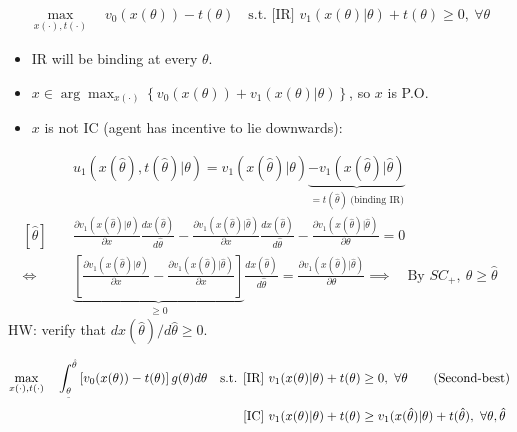 \documentclass[11pt,leqno]{article}
\begin{document}

\begin{align}
    \max_{x(\cdot),t(\cdot)} \quad v_{0}(x(\theta))-t(\theta)\quad \text{s.t. [IR] } v_{1}(x(\theta)|\theta)+t(\theta)\geq 0,~ \forall \theta \tag{First-best}
\end{align}
\begin{itemize}
    \item IR will be binding at every $\theta$.
    \item $x\in \arg \max_{x(\cdot)} \left\{ v_{0}(x(\theta))+ v_{1}(x(\theta)|\theta)\right\}$, so $x$ is P.O.
    \item $x$ is not IC (agent has incentive to lie downwards):
\end{itemize}

\begin{align*}
    &u_{1}(x(\hat{\theta}),t(\hat{\theta})|\theta)=v_{1}(x(\hat{\theta})|\theta)\underbrace{-v_{1}(x(\hat{\theta})|\hat{\theta})}_{=t(\hat{\theta}) ~\text{(binding IR)}}\\
    [\hat{\theta}] \quad &\frac{\partial v_{1}(x(\hat{\theta})|\theta)}{\partial x}\frac{d x(\hat{\theta})}{d \hat{\theta}}-\frac{\partial v_{1}(x(\hat{\theta})|\hat{\theta})}{\partial x}\frac{d x(\hat{\theta})}{d \hat{\theta}}-\frac{\partial v_{1}(x(\hat{\theta})|\hat{\theta})}{\partial \theta}=0\\
    \iff \quad &\underbrace{\left[\frac{\partial v_{1}(x(\hat{\theta})|\theta)}{\partial x}-\frac{\partial v_{1}(x(\hat{\theta})|\hat{\theta})}{\partial x}\right]}_{\geq 0}\frac{d x(\hat{\theta})}{d \hat{\theta}}=\frac{\partial v_{1}(x(\hat{\theta})|\hat{\theta})}{\partial \theta}
    \implies \quad \text{By } SC_{+}, ~\theta \geq \hat{\theta}
\end{align*}
HW: verify that $d x(\hat{\theta})/d \hat{\theta}\geq 0$.

\begin{align}
    \max_{x(\cdot),t(\cdot)} \quad \int_{\underset{\bar{}}{\theta}}^{\hat{\theta}} \left[v_{0}(x(\theta))-t(\theta)\right] g(\theta) d\theta \quad \text{s.t. [IR] } &v_{1}(x(\theta)|\theta)+t(\theta)\geq 0,~ \forall \theta \tag{Second-best} \\ \text{[IC] }&v_{1}(x(\theta)|\theta)+t(\theta)\geq v_{1}(x(\hat{\theta})|\theta)+t(\hat{\theta}),~ \forall \theta, \hat{\theta} \notag
\end{align}
\end{document}

